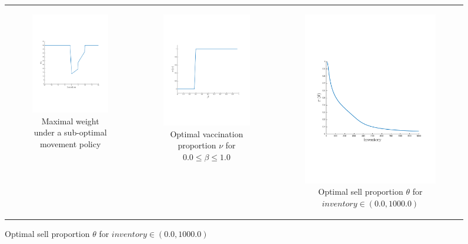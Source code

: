 {\centering
    \begin{figure}[ht]
        \begin{tabular}{ccc}
            \begin{subfigure}{0.33\textwidth}\centering\includegraphics[width=0.9\linewidth, height=0.55\linewidth]{images/robot_opt_new}\caption{Maximal weight under a sub-optimal movement policy}\label{fig:navigation_opt}\end{subfigure}&
            \begin{subfigure}{0.33\textwidth}\centering\includegraphics[width=0.9\linewidth, height=0.55\linewidth]{images/sir_opt_new}\caption{Optimal vaccination proportion {\footnotesize $ \nu $} for {\footnotesize $ 0.0 \leq \beta \leq 1.0 $}}\label{fig:sir_opt}\end{subfigure}&
            \begin{subfigure}{0.33\textwidth}\centering\includegraphics[width=0.9\linewidth, height=0.55\linewidth]{images/oe_opt_new}\caption{Optimal sell proportion $ \theta $ for {\footnotesize $ inventory \in \left(0.0, 1000.0 \right) $}}\label{fig:oe_opt}\end{subfigure}\\

\end{tabular}
\end{figure}}
